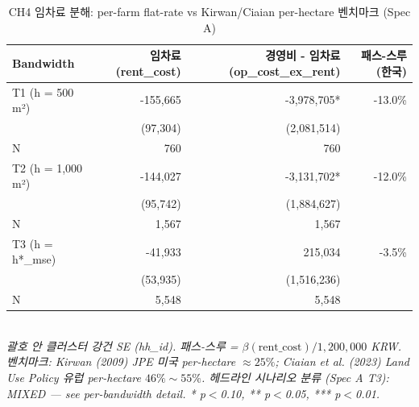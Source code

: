 \begin{table}[t]
\centering
\caption{CH4 임차료 분해: per-farm flat-rate vs Kirwan/Ciaian per-hectare 벤치마크 (Spec A)}
\label{tab:ch4_rent_ko}
\begin{tabular}{lrrr}
\toprule
Bandwidth & 임차료 (rent\_cost) & 경영비 - 임차료 (op\_cost\_ex\_rent) & 패스-스루 (한국) \\
\midrule
T1 (h = 500 m²) & -155,665 & -3,978,705* & -13.0\% \\
        & (97,304) & (2,081,514) & \\
N       & 760 & 760 & \\
T2 (h = 1,000 m²) & -144,027 & -3,131,702* & -12.0\% \\
        & (95,742) & (1,884,627) & \\
N       & 1,567 & 1,567 & \\
T3 (h = h*_mse) & -41,933 & 215,034 & -3.5\% \\
        & (53,935) & (1,516,236) & \\
N       & 5,548 & 5,548 & \\
\bottomrule
\end{tabular}
\\
\footnotesize\textit{괄호 안 클러스터 강건 SE (hh\_id). 패스-스루 = $\beta(\text{rent\_cost}) / 1{,}200{,}000$ KRW. 벤치마크: Kirwan (2009) JPE 미국 per-hectare $\approx 25\%$; Ciaian et al. (2023) Land Use Policy 유럽 per-hectare $46\% \sim 55\%$. 헤드라인 시나리오 분류 (Spec A T3): MIXED — see per-bandwidth detail. * p$<$0.10, ** p$<$0.05, *** p$<$0.01.}
\end{table}

